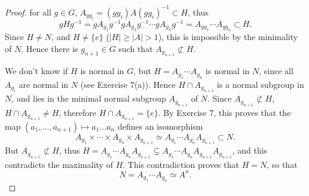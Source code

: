 \documentclass[11pt,a4paper]{article}
\begin{document}
\begin{proof}
for all $g \in G$, $A_{gg_i}= (gg_i)A(gg_i)^{-1} \subset H$, thus
$$gHg^{-1} = gA_{g_1}g^{-1} gA_{g_2}g^{-1} \cdots gA_{g_n}g^{-1} = A_{gg_1}\cdots A_{gg_n} \subset H.$$
Since $H \ne N$, and $H \ne \{e\}$ ($|H| \geq |A|>1$), this is impossible by the minimality of $N$. Hence there is $g_{n+1} \in G$ such that $A_{g_{n+1}} \not \subset H$.

We don't know if $H$ is normal in $G$, but $H = A_{g_1}\cdots A_{g_n}$ is normal in $N$, since all $A_{g_i}$ are normal in $N$ (see Exercise 7(a)). Hence $H \cap A_{g_{n+1}}$ is a normal subgroup in $N$, and lies in the minimal normal subgroup $A_{g_{n+1}}$ of $N$. Since $A_{g_{n+1}} \not \subset H$, $H \cap A_{g_{n+1}} \ne H$, therefore $H \cap A_{g_{n+1}} = \{e\}$. By Exercise 7, this proves that the map $(a_1,\ldots,a_{n+1}) \mapsto a_1\ldots a_n$ defines an isomorphism
$$A_{g_1}\times\cdots\times A_{g_n}\times A_{g_{n+1}} \simeq A_{g_1}\cdots A_{g_n} A_{g_{n+1}} \subset N.$$
But $A_{g_{n+1}} \not \subset H$, thus $H =  A_{g_1}\cdots A_{g_n} A_{g_{n+1}}   \subsetneq A_{g_1}\cdots A_{g_n} A_{g_{n+1}} A_{g_{n+1}}$, and this contradicts the maximality of $H$. This contradiction proves that $H = N$, so that
$$N = A_{g_1}\cdots A_{g_n} \simeq A^n.$$
\end{proof}
\end{document}

